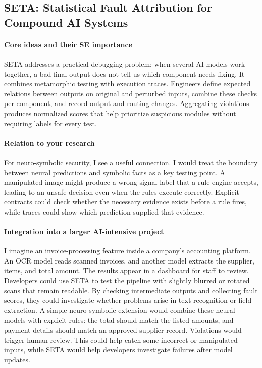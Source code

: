 \documentclass[11pt]{article}
\begin{document}
\subsection{SETA: Statistical Fault Attribution for Compound AI Systems \cite{chowdhury2026seta}}

\paragraph{Core ideas and their SE importance}

SETA addresses a practical debugging problem: when several AI models work together, a bad final output does not tell us which component needs fixing. It combines metamorphic testing with execution traces. Engineers define expected relations between outputs on original and perturbed inputs, combine these checks per component, and record output and routing changes.
Aggregating violations produces normalized scores that help prioritize suspicious modules without requiring labels for every test. 

\paragraph{Relation to your research}

For neuro-symbolic security, I see a useful connection. I would treat the boundary between neural predictions and symbolic facts as a key testing point. A manipulated image might produce a wrong signal label that a rule engine accepts, leading to an unsafe decision even when the rules execute correctly. Explicit contracts could check whether the necessary evidence exists before a rule fires, while traces could show which prediction supplied that evidence.

\paragraph{Integration into a larger AI-intensive project}

I imagine an invoice-processing feature inside a company's accounting platform. An OCR model reads scanned invoices, and another model extracts the supplier, items, and total amount. 
The results appear in a dashboard for staff to review. Developers could use SETA to test the pipeline with slightly blurred or rotated scans that remain readable. By checking intermediate outputs and collecting fault scores, they could investigate whether problems arise in text recognition or field extraction. A simple neuro-symbolic extension would combine these neural models with explicit rules: the total should match the listed amounts, and payment details should match an approved supplier record. Violations would trigger human review. This could help catch some incorrect or manipulated inputs, while SETA would help developers investigate failures after model updates.
\end{document}

